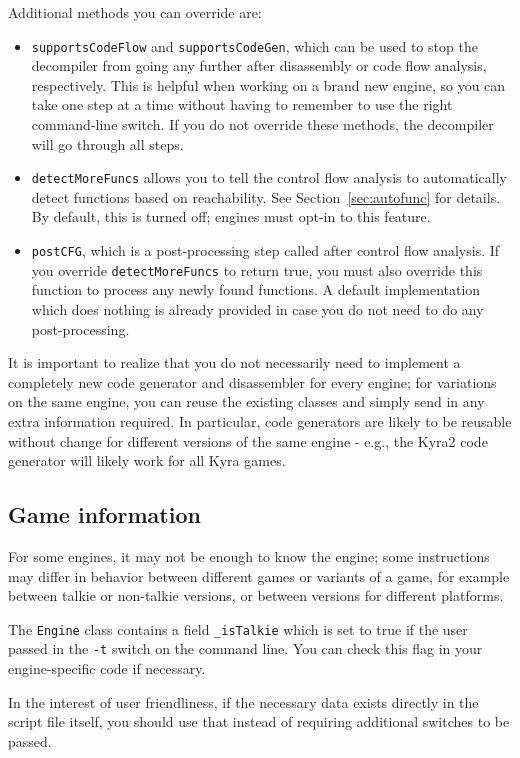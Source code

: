 Additional methods you can override are:
\begin{itemize}
\item \verb+supportsCodeFlow+ and \verb+supportsCodeGen+, which can be used to stop the decompiler from going any further after disassembly or code flow analysis, respectively. This is helpful when working on a brand new engine, so you can take one step at a time without having to remember to use the right command-line switch. If you do not override these methods, the decompiler will go through all steps.
\item \verb+detectMoreFuncs+ allows you to tell the control flow analysis to automatically detect functions based on reachability. See Section~\vref{sec:autofunc} for details. By default, this is turned off; engines must opt-in to this feature.
\item \verb+postCFG+, which is a post-processing step called after control flow analysis. If you override \verb+detectMoreFuncs+ to return true, you must also override this function to process any newly found functions. A default implementation which does nothing is already provided in case you do not need to do any post-processing.
\end{itemize}

It is important to realize that you do not necessarily need to implement a completely new code generator and disassembler for every engine; for variations on the same engine, you can reuse the existing classes and simply send in any extra information required. In particular, code generators are likely to be reusable without change for different versions of the same engine - e.g., the Kyra2 code generator will likely work for all Kyra games.

\subsection{Game information}
For some engines, it may not be enough to know the engine; some instructions may differ in behavior between different games or variants of a game, for example between talkie or non-talkie versions, or between versions for different platforms.

The \verb+Engine+ class contains a field \verb+_isTalkie+ which is set to true if the user passed in the \verb+-t+ switch on the command line. You can check this flag in your engine-specific code if necessary.

In the interest of user friendliness, if the necessary data exists directly in the script file itself, you should use that instead of requiring additional switches to be passed.

